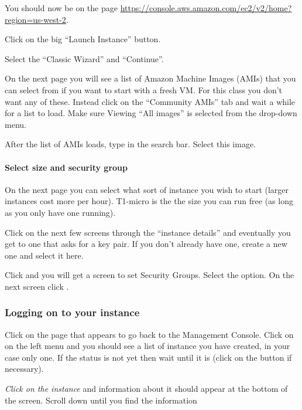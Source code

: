 \documentclass[letterpaper,10pt,english]{sphinxmanual}
\begin{document}
You should now be on the page
\url{https://console.aws.amazon.com/ec2/v2/home?region=us-west-2}.

Click on the big ``Launch Instance'' button.

Select the ``Classic Wizard'' and ``Continue''.

On the next page you will see a list of Amazon Machine Images (AMIs) that
you can select from if you want to start with a fresh VM.  For this class
you don't want any of these.  Instead click on the ``Community AMIs'' tab and
wait a while for a list to load.
Make sure Viewing ``All images'' is selected from the drop-down menu.

After the list of AMIs loads, type  in the search bar.
Select this image.


\paragraph{Select size and security group}
\label{2013/aws:select-size-and-security-group}\label{2013/aws:aws-select-size}
On the next page you can select what sort of instance you wish to start (larger
instances cost more per hour). T1-micro is the the size you can run free (as
long as you only have one running).

Click  on the next few screens through the ``instance details''
and eventually you get to one that
asks for a key pair.  If you don't already have one, create a new one and
select it here.

Click  and you will get a screen to set Security Groups.  Select
the  option.  On the next screen click .


\subsubsection{Logging on to your instance}
\label{2013/aws:logging-on-to-your-instance}
Click  on the  page that appears to
go back to the Management Console.  Click on  on the left menu
and you should see a list of instance you
have created, in your case only one.  If the status is not yet 
then wait until it is (click on the  button if necessary).

\emph{Click on the instance} and information about it should appear at the bottom
of the screen. Scroll down until you find the  information
\end{document}
